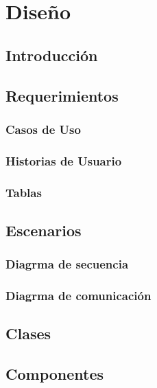 \chapter{Diseño}

\section{Introducción}

\section{Requerimientos}

\subsection{Casos de Uso}

\subsection{Historias de Usuario}

\subsection{Tablas}

\newpage

\section{Escenarios}

\subsection{Diagrma de secuencia}

\subsection{Diagrma de comunicación}

\newpage

\section{Clases}

\newpage

\section{Componentes}


